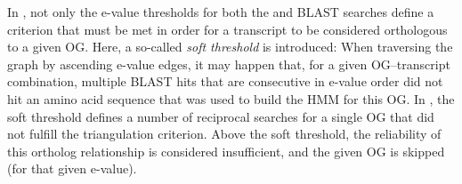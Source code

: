 In \pname, not only the e-value thresholds for both the  and
BLAST searches define a criterion that must be met in order for a transcript to
be considered orthologous to a given OG. Here, a so-called \emph{soft threshold}
is introduced: When traversing the graph by ascending  e-value
edges, it may happen that, for a given OG--transcript combination, multiple
BLAST hits that are consecutive in e-value order did not hit an amino acid
sequence that was used to build the HMM for this OG. In \pname, the soft
threshold defines a number of reciprocal searches for a single OG that did not
fulfill the triangulation criterion. Above the soft threshold, the reliability
of this ortholog relationship is considered insufficient, and the given OG is
skipped (for that given  e-value). 

